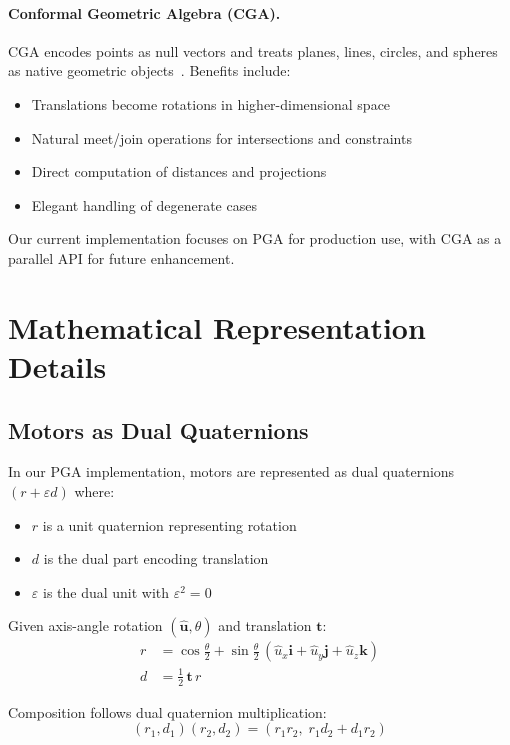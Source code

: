 \documentclass[11pt]{article}
\begin{document}
\paragraph{Conformal Geometric Algebra (CGA).}
CGA encodes points as null vectors and treats planes, lines, circles, and spheres as native geometric objects~\cite{dorst2009gacs}. Benefits include:
\begin{itemize}
    \item Translations become rotations in higher-dimensional space
    \item Natural meet/join operations for intersections and constraints
    \item Direct computation of distances and projections
    \item Elegant handling of degenerate cases
\end{itemize}

Our current implementation focuses on PGA for production use, with CGA as a parallel API for future enhancement.

\section{Mathematical Representation Details}

\subsection{Motors as Dual Quaternions}

In our PGA implementation, motors are represented as dual quaternions $(r + \varepsilon d)$ where:
\begin{itemize}
    \item $r$ is a unit quaternion representing rotation
    \item $d$ is the dual part encoding translation  
    \item $\varepsilon$ is the dual unit with $\varepsilon^2 = 0$
\end{itemize}

Given axis-angle rotation $(\mathbf{\hat{u}}, \theta)$ and translation $\mathbf{t}$:
\begin{align}
r &= \cos \frac{\theta}{2} + \sin \frac{\theta}{2} \, (\hat{u}_x \mathbf{i} + \hat{u}_y \mathbf{j} + \hat{u}_z \mathbf{k})\\
d &= \frac{1}{2} \, \mathbf{t}\, r
\end{align}

Composition follows dual quaternion multiplication:
\[(r_1, d_1)(r_2, d_2) = (r_1 r_2,\; r_1 d_2 + d_1 r_2)\]
\end{document}
